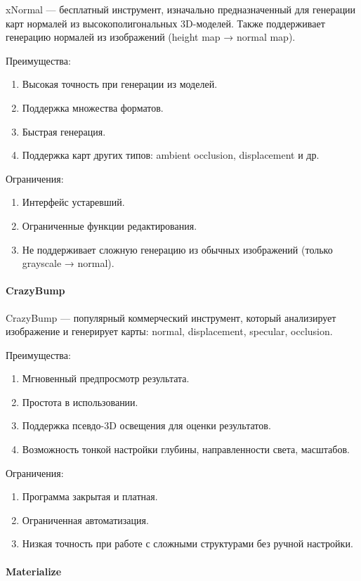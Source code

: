 xNormal — бесплатный инструмент, изначально предназначенный для генерации карт нормалей из высокополигональных 3D-моделей. Также поддерживает генерацию нормалей из изображений (height map → normal map).

Преимущества:
\begin{enumerate}
	\item Высокая точность при генерации из моделей.
	\item Поддержка множества форматов.
	\item Быстрая генерация.
	\item Поддержка карт других типов: ambient occlusion, displacement и др.
\end{enumerate}

Ограничения:
\begin{enumerate}
	\item Интерфейс устаревший.
	\item Ограниченные функции редактирования.
	\item Не поддерживает сложную генерацию из обычных изображений (только grayscale → normal).
\end{enumerate}
\paragraph{CrazyBump}

CrazyBump — популярный коммерческий инструмент, который анализирует изображение и генерирует карты: normal, displacement, specular, occlusion.

Преимущества:
\begin{enumerate}
	\item Мгновенный предпросмотр результата.
	\item Простота в использовании.
	\item Поддержка псевдо-3D освещения для оценки результатов.
	\item Возможность тонкой настройки глубины, направленности света, масштабов.
\end{enumerate}

Ограничения:
\begin{enumerate}
	\item Программа закрытая и платная.
	\item Ограниченная автоматизация.
	\item Низкая точность при работе с сложными структурами без ручной настройки.
\end{enumerate}
\paragraph{Materialize}

